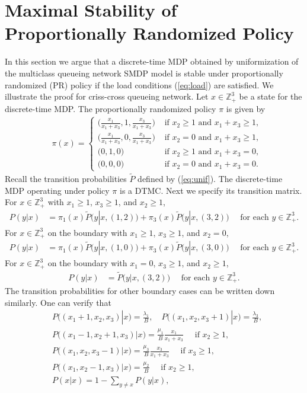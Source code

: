 \documentclass[11pt]{article}
\newcommand{\Z}{\mathbb{Z}}
\theoremstyle{definition}
\numberwithin{equation}{section}
\begin{document}
\section{Maximal Stability of Proportionally Randomized Policy}\label{sec:PR}


In this section we argue that a discrete-time MDP obtained by
uniformization of the multiclass queueing network SMDP model is stable
under proportionally randomized (PR) policy if the load conditions
(\ref{eq:load}) are satisfied. We illustrate the proof for criss-cross
queueing network. Let $x\in \Z_+^3$ be a state for the discrete-time
MDP. The proportionally randomized policy $\pi$ is given by
\begin{align*}
  & \pi(x) =
    \begin{cases}
      \Big(\frac{x_1}{x_1+x_3}, 1, \frac{x_3}{x_1+x_3}\Big) & \text{ if } x_2\ge 1 \text{ and } x_1+x_3\ge 1, \\
      \Big(\frac{x_1}{x_1+x_3}, 0, \frac{x_3}{x_1+x_3}\Big) & \text{ if } x_2= 0 \text{ and } x_1+x_3\ge 1, \\
    \big(0, 1, 0\big) & \text{ if } x_2\ge 1 \text{ and } x_1+x_3=0 , \\
     \big(0, 0, 0\big) & \text{ if } x_2=0 \text{ and } x_1+x_3=0.
      \end{cases}
\end{align*}
Recall the transition probabilities $\tilde P$ defined by (\ref{eq:unif}).  The
discrete-time MDP operating under policy $\pi$ is a DTMC. Next we specify its
transition matrix.  For $x\in \Z_+^3$ with $x_1\ge 1$, $x_3\ge 1$, and $x_2\ge 1$,
\begin{align*}
  P(y|x)& = \pi_1(x)\tilde P\big(y|x,(1,2)\big)+\pi_3(x)\tilde P\big(y|x,(3,2)\big) \quad \text{ for each } y\in \Z_+^3.
\end{align*}
For $x\in \Z_+^3$ on the boundary with $x_1\ge 1$, $x_3\ge 1$, and $x_2= 0$,
\begin{align*}
  P(y|x)& = \pi_1(x)\tilde P\big(y|x,(1,0)\big)+\pi_3(x)\tilde P\big(y|x,(3,0)\big) \quad \text{ for each } y\in \Z_+^3.
\end{align*}
For $x\in \Z_+^3$ on the boundary with $x_1= 0$, $x_3\ge 1$, and $x_2\ge 1$,
\begin{align*}
  P(y|x)& = \tilde P\big(y|x,(3,2)\big) \quad \text{ for each } y\in \Z_+^3.
\end{align*}
The transition probabilities for other boundary cases can be written
down similarly. One can verify that
\begin{align}
  & P\big((x_1+1,x_2, x_3)| x\big)  = \frac{\lambda_1}{B},
    \quad    P\big((x_1,x_2, x_3+1)| x\big)  = \frac{\lambda_3}{B}, \label{eq:pr1}\\
  &  P\big((x_1-1,x_2+1, x_3)| x\big) =\frac{\mu_1}{B}\frac{x_1}{x_1+x_3}  \quad \text{ if } x_2\ge 1, \\
  & P\big((x_1,x_2, x_3-1)| x\big) =\frac{\mu_3}{B}\frac{x_3}{x_1+x_3} \quad \text{ if } x_3\ge 1, \\
  &  P\big((x_1,x_2-1, x_3)| x\big) =\frac{\mu_2}{B} \quad \text{ if } x_2\ge 1, \\
  & P(x|x) = 1- \sum_{y\neq x} P(y|x),\label{eq:pr5}
\end{align}
\end{document}
